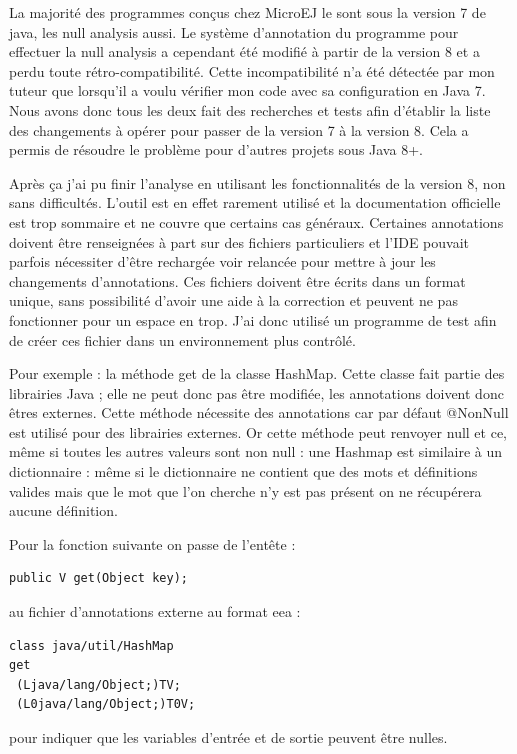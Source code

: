 \documentclass[french,a4paper,12pt]{report}
\begin{document}
La majorité des programmes conçus chez MicroEJ le sont sous la version 7 de java, les null analysis aussi. Le système d'annotation du programme pour effectuer la null analysis a cependant été modifié à partir de la version 8 et a perdu toute rétro-compatibilité. Cette incompatibilité n'a été détectée par mon tuteur que lorsqu'il a voulu vérifier mon code avec sa configuration en Java 7. Nous avons donc tous les deux fait des recherches et tests afin d'établir la liste des changements à opérer pour passer de la version 7 à la version 8. 
Cela a permis de résoudre le problème pour d'autres projets sous Java 8+.

Après ça j'ai pu finir l'analyse en utilisant les fonctionnalités de la version 8, non sans difficultés. L’outil est en effet rarement utilisé et la documentation officielle est trop sommaire et ne couvre que certains cas généraux. Certaines annotations doivent être renseignées à part sur des fichiers particuliers et l'IDE pouvait parfois nécessiter d'être rechargée voir relancée pour mettre à jour les changements d'annotations. Ces fichiers doivent être écrits dans un format unique, sans possibilité d'avoir une aide à la correction et peuvent ne pas fonctionner pour un espace en trop. J'ai donc utilisé un programme de test afin de créer ces fichier dans un environnement plus contrôlé.

Pour exemple : la méthode get de la classe HashMap. Cette classe fait partie des librairies Java ; elle ne peut donc pas être modifiée, les annotations doivent donc êtres externes. Cette méthode nécessite des annotations car par défaut @NonNull est utilisé pour des librairies externes. Or cette méthode peut renvoyer null et ce, même si toutes les autres valeurs sont non null : une Hashmap est similaire à un dictionnaire : même si le dictionnaire ne contient que des mots et définitions valides mais que le mot que l'on cherche n'y est pas présent on ne récupérera aucune définition.

Pour la fonction suivante on passe de l’entête :
\begin{lstlisting}
public V get(Object key);
\end{lstlisting}

au fichier d’annotations externe au format eea :

\begin{verbatim}
class java/util/HashMap
get
 (Ljava/lang/Object;)TV;
 (L0java/lang/Object;)T0V;
\end{verbatim}

pour indiquer que les variables d'entrée et de sortie peuvent être nulles.
\end{document}

